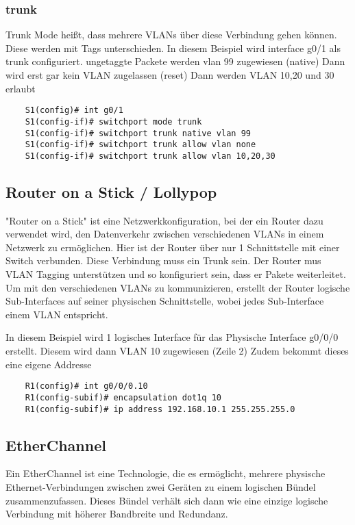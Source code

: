 \documentclass[asp2.tex]{subfiles}
\begin{document}
\subsubsection{trunk}

Trunk Mode heißt, dass mehrere VLANs über diese Verbindung gehen können. Diese werden mit Tags unterschieden.
In diesem Beispiel wird interface g0/1 als trunk configuriert. 
ungetaggte Packete werden vlan 99 zugewiesen (native)
Dann wird erst gar kein VLAN zugelassen (reset)
Dann werden VLAN 10,20 und 30 erlaubt

\begin{lstlisting}
    S1(config)# int g0/1
    S1(config-if)# switchport mode trunk
    S1(config-if)# switchport trunk native vlan 99
    S1(config-if)# switchport trunk allow vlan none
    S1(config-if)# switchport trunk allow vlan 10,20,30
\end{lstlisting}

\subsection{Router on a Stick / Lollypop}

"Router on a Stick" ist eine Netzwerkkonfiguration, bei der ein Router dazu verwendet wird, 
den Datenverkehr zwischen verschiedenen VLANs in einem Netzwerk zu ermöglichen.
Hier ist der Router über nur 1 Schnittstelle mit einer Switch verbunden.
Diese Verbindung muss ein Trunk sein.
Der Router mus VLAN Tagging unterstützen und so konfiguriert sein, dass er Pakete weiterleitet.
Um mit den verschiedenen VLANs zu kommunizieren, erstellt der Router logische Sub-Interfaces 
auf seiner physischen Schnittstelle, wobei jedes Sub-Interface einem VLAN entspricht.

In diesem Beispiel wird 1 logisches Interface für das Physische Interface g0/0/0 erstellt.
Diesem wird dann VLAN 10 zugewiesen (Zeile 2)
Zudem bekommt dieses eine eigene Addresse

\begin{lstlisting}
    R1(config)# int g0/0/0.10
    R1(config-subif)# encapsulation dot1q 10
    R1(config-subif)# ip address 192.168.10.1 255.255.255.0
\end{lstlisting}

\subsection{EtherChannel}

Ein EtherChannel ist eine Technologie, die es ermöglicht, mehrere physische Ethernet-Verbindungen
 zwischen zwei Geräten zu einem logischen Bündel zusammenzufassen. 
 Dieses Bündel verhält sich dann wie eine einzige logische Verbindung mit höherer Bandbreite und Redundanz.
\end{document}
